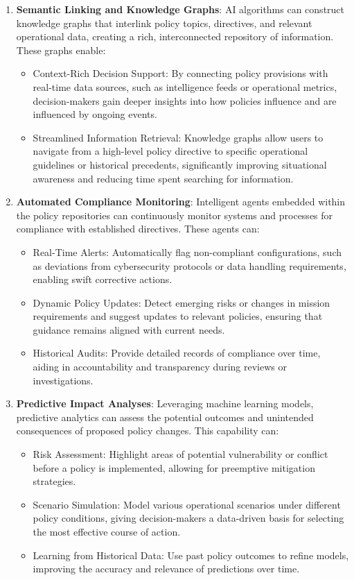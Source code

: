 \documentclass[11pt]{article}
\begin{document}
	\begin{enumerate}
		\item \textbf{Semantic Linking and Knowledge Graphs}:
		AI algorithms can construct knowledge graphs that interlink policy topics, directives, and relevant operational data, creating a rich, interconnected repository of information. These graphs enable:
		\begin{itemize}
			\item Context-Rich Decision Support: By connecting policy provisions with real-time data sources, such as intelligence feeds or operational metrics, decision-makers gain deeper insights into how policies influence and are influenced by ongoing events.
			\item Streamlined Information Retrieval: Knowledge graphs allow users to navigate from a high-level policy directive to specific operational guidelines or historical precedents, significantly improving situational awareness and reducing time spent searching for information.
		\end{itemize}

		\item \textbf{Automated Compliance Monitoring}:
		Intelligent agents embedded within the policy repositories can continuously monitor systems and processes for compliance with established directives. These agents can:
		\begin{itemize}
			\item Real-Time Alerts: Automatically flag non-compliant configurations, such as deviations from cybersecurity protocols or data handling requirements, enabling swift corrective actions.
			\item Dynamic Policy Updates: Detect emerging risks or changes in mission requirements and suggest updates to relevant policies, ensuring that guidance remains aligned with current needs.
			\item Historical Audits: Provide detailed records of compliance over time, aiding in accountability and transparency during reviews or investigations.
		\end{itemize}

		\item \textbf{Predictive Impact Analyses}:
		Leveraging machine learning models, predictive analytics can assess the potential outcomes and unintended consequences of proposed policy changes. This capability can:
		\begin{itemize}
			\item Risk Assessment: Highlight areas of potential vulnerability or conflict before a policy is implemented, allowing for preemptive mitigation strategies.
			\item Scenario Simulation: Model various operational scenarios under different policy conditions, giving decision-makers a data-driven basis for selecting the most effective course of action.
			\item Learning from Historical Data: Use past policy outcomes to refine models, improving the accuracy and relevance of predictions over time.
		\end{itemize}


\end{enumerate}
\end{document}
